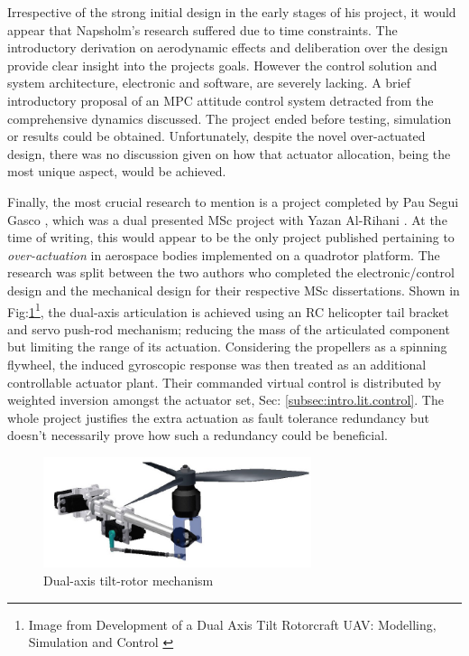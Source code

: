 \par
Irrespective of the strong initial design in the early stages of his project, it would appear that Napsholm's research suffered due to time constraints. The introductory derivation on aerodynamic effects and deliberation over the design provide clear insight into the projects goals. However the control solution and system architecture, electronic and software, are severely lacking. A brief introductory proposal of an MPC attitude control system detracted from the comprehensive dynamics discussed. The project ended before testing, simulation or results could be obtained. Unfortunately, despite the novel over-actuated design, there was no discussion given on how that actuator allocation, being the most unique aspect, would be achieved.
\par
Finally, the most crucial research to mention is a project completed by Pau Segui Gasco \cite{tiltgasco}, which was a dual presented MSc project with Yazan Al-Rihani \cite{tiltrihani}. At the time of writing, this would appear to be the only project published pertaining to \emph{over-actuation} in aerospace bodies implemented on a quadrotor platform. The research was split between the two authors who completed the electronic/control design and the mechanical design for their respective MSc dissertations. Shown in Fig:\ref{fig:tiltrotor-gasco}\footnote{Image from Development of a Dual Axis Tilt Rotorcraft UAV: Modelling, Simulation and Control \cite{tiltgasco}}, the dual-axis articulation is achieved using an RC helicopter tail bracket and servo push-rod mechanism; reducing the mass of the articulated component but limiting the range of its actuation. Considering the propellers as a spinning flywheel, the induced gyroscopic response was then treated as an additional controllable actuator plant. Their commanded virtual control is distributed by weighted inversion amongst the actuator set, Sec: \ref{subsec:intro.lit.control}. The whole project justifies the extra actuation as fault tolerance redundancy but doesn't necessarily prove how such a redundancy could be beneficial.
\begin{figure}[htbp]
\centering
\includegraphics[width=0.7\textwidth]{figs/gasco-mech}
\caption{Dual-axis tilt-rotor mechanism}
\label{fig:tiltrotor-gasco}
\end{figure}
